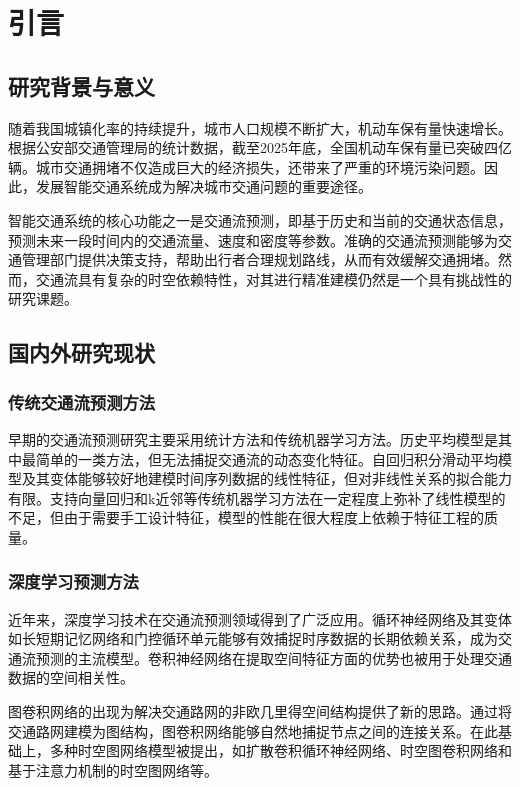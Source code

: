 \documentclass[12pt,a4paper,twoside]{ctexbook}
\begin{document}
\tableofcontents

\chapter{引言}
\section{研究背景与意义}
随着我国城镇化率的持续提升，城市人口规模不断扩大，机动车保有量快速增长。根据公安部交通管理局的统计数据，截至2025年底，全国机动车保有量已突破四亿辆。城市交通拥堵不仅造成巨大的经济损失，还带来了严重的环境污染问题。因此，发展智能交通系统成为解决城市交通问题的重要途径。

智能交通系统的核心功能之一是交通流预测，即基于历史和当前的交通状态信息，预测未来一段时间内的交通流量、速度和密度等参数。准确的交通流预测能够为交通管理部门提供决策支持，帮助出行者合理规划路线，从而有效缓解交通拥堵。然而，交通流具有复杂的时空依赖特性，对其进行精准建模仍然是一个具有挑战性的研究课题。

\section{国内外研究现状}
\subsection{传统交通流预测方法}
早期的交通流预测研究主要采用统计方法和传统机器学习方法。历史平均模型是其中最简单的一类方法，但无法捕捉交通流的动态变化特征。自回归积分滑动平均模型及其变体能够较好地建模时间序列数据的线性特征，但对非线性关系的拟合能力有限。支持向量回归和k近邻等传统机器学习方法在一定程度上弥补了线性模型的不足，但由于需要手工设计特征，模型的性能在很大程度上依赖于特征工程的质量。

\subsection{深度学习预测方法}
近年来，深度学习技术在交通流预测领域得到了广泛应用。循环神经网络及其变体如长短期记忆网络和门控循环单元能够有效捕捉时序数据的长期依赖关系，成为交通流预测的主流模型。卷积神经网络在提取空间特征方面的优势也被用于处理交通数据的空间相关性。

图卷积网络的出现为解决交通路网的非欧几里得空间结构提供了新的思路。通过将交通路网建模为图结构，图卷积网络能够自然地捕捉节点之间的连接关系。在此基础上，多种时空图网络模型被提出，如扩散卷积循环神经网络、时空图卷积网络和基于注意力机制的时空图网络等。
\end{document}
